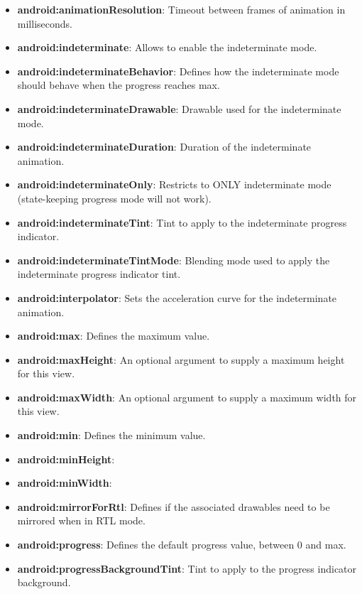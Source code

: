 \documentclass{report}
\begin{document}
\begin{itemize}
            \begin{itemize}
                \item \textbf{android:animationResolution}:	Timeout between frames of animation in milliseconds. 
                \item \textbf{android:indeterminate}:	Allows to enable the indeterminate mode. 
                \item \textbf{android:indeterminateBehavior}:	Defines how the indeterminate mode should behave when the progress reaches max. 
                \item \textbf{android:indeterminateDrawable}:	Drawable used for the indeterminate mode. 
                \item \textbf{android:indeterminateDuration}:	Duration of the indeterminate animation. 
                \item \textbf{android:indeterminateOnly}:	Restricts to ONLY indeterminate mode (state-keeping progress mode will not work). 
                \item \textbf{android:indeterminateTint}:	Tint to apply to the indeterminate progress indicator. 
                \item \textbf{android:indeterminateTintMode}:	Blending mode used to apply the indeterminate progress indicator tint. 
                \item \textbf{android:interpolator}:	Sets the acceleration curve for the indeterminate animation. 
                \item \textbf{android:max}:	Defines the maximum value. 
                \item \textbf{android:maxHeight}:	An optional argument to supply a maximum height for this view. 
                \item \textbf{android:maxWidth}:	An optional argument to supply a maximum width for this view. 
                \item \textbf{android:min}:	Defines the minimum value. 
                \item \textbf{android:minHeight}:	 
                \item \textbf{android:minWidth}:	 
                \item \textbf{android:mirrorForRtl}:	Defines if the associated drawables need to be mirrored when in RTL mode. 
                \item \textbf{android:progress}:	Defines the default progress value, between 0 and max. 
                \item \textbf{android:progressBackgroundTint}:	Tint to apply to the progress indicator background. 

\end{itemize}
\end{itemize}
\end{document}
